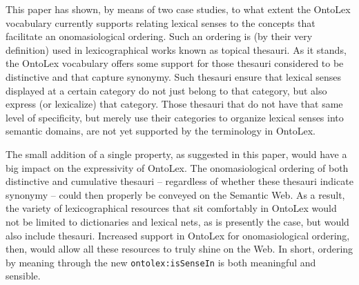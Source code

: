 This paper has shown, by means of two case studies, to what extent the OntoLex vocabulary currently supports relating lexical senses to the concepts that facilitate an onomasiological ordering. Such an ordering is (by their very definition) used in lexicographical works known as topical thesauri. As it stands, the OntoLex vocabulary offers some support for those thesauri considered to be distinctive and that capture synonymy. Such thesauri ensure that lexical senses displayed at a certain category do not just belong to that category, but also express (or lexicalize) that category. Those thesauri that do not have that same level of specificity, but merely use their categories to organize lexical senses into semantic domains, are not yet supported by the terminology in OntoLex.

The small addition of a single property, as suggested in this paper, would have a big impact on the expressivity of OntoLex. The onomasiological ordering of both distinctive and cumulative thesauri -- regardless of whether these thesauri indicate synonymy -- could then properly be conveyed on the Semantic Web. As a result, the variety of lexicographical resources that sit comfortably in OntoLex would not be limited to dictionaries and lexical nets, as is presently the case, but would also include thesauri. Increased support in OntoLex for onomasiological ordering, then, would allow all these resources to truly shine on the Web. In short, ordering by meaning through the new \texttt{ontolex:isSenseIn} is both meaningful and sensible.



%
%


%
%

